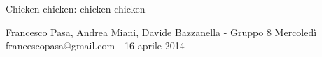\documentclass[11pt, twoside, a4paper]{article}
\begin{document}
\begin{center}

        {\huge Chicken chicken: chicken chicken}
    \vspace{0.1cm}

      	{Francesco Pasa, Andrea Miani, Davide Bazzanella - Gruppo 8 Mercoledì} \\
      	{francescopasa@gmail.com - 16 aprile 2014}
    \vspace{-0.2cm}

\end{center}





\end{document}
